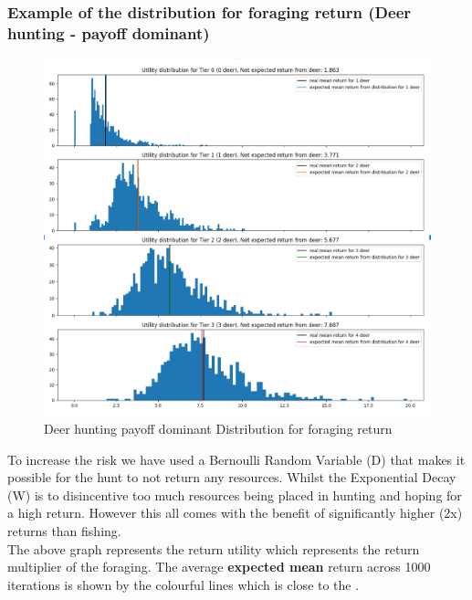 \subsubsection{Example of the distribution for foraging return (Deer hunting - payoff dominant)}

\begin{figure}[!htb]
    \centering
    \includegraphics[width=1\textwidth]{04_environment/Images/Distribution of Foraging returns Deer Hunting.PNG}
    \caption{Deer hunting payoff dominant Distribution for foraging return}
    \label{Images:Distribution of Foraging returns Deer Hunting}
\end{figure}

To increase the risk we have used a Bernoulli Random Variable (D) that makes it possible for the hunt to not return any resources. Whilst the Exponential Decay (W) is to disincentive too much resources being placed in hunting and hoping for a high return. However this all comes with the benefit of significantly higher (2x) returns than fishing.\\ 

The above graph represents the return utility which represents the return multiplier of the foraging. The average \textbf{expected mean} return across 1000 iterations is shown by the colourful lines which is close to the .\\


